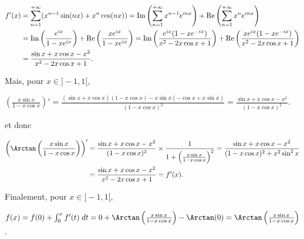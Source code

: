 {\begin{enumerate}
{\begin{align*}\ensuremath
f'(x)&=\sum_{n=1}^{+\infty}(x^{n-1}\sin(nx)+x^n\cos(nx))=\text{Im}\left(\sum_{n=1}^{+\infty}x^{n-1}e^{inx}\right)+\text{Re}\left(\sum_{n=1}^{+\infty}x^{n}e^{inx}\right)\\
 &=\text{Im}\left(\frac{e^{ix}}{1-xe^{ix}}\right)+\text{Re}\left(\frac{xe^{ix}}{1-xe^{ix}}\right)=\text{Im}\left(\frac{e^{ix}(1-xe^{-ix})}{x^2-2x\cos x+1}\right) +\text{Re}\left(\frac{xe^{ix}(1-xe^{-ix})}{x^2-2x\cos x+1}\right)\\
  &=\frac{\sin x+x\cos x-x^2}{x^2-2x\cos x+1}  .
\end{align*}

Mais, pour $x\in]-1,1[$,

\begin{center}
$\left(\frac{x\sin x}{1-x\cos x}\right)'=\frac{(\sin x+x\cos x)(1-x\cos x)-x\sin x(-\cos x+x\sin x)}{(1-x\cos x)^2}=\frac{\sin x+x\cos x-x^2}{(1-x\cos x)^2}$.
\end{center}

et donc

\begin{align*}\ensuremath
\left(\Arctan\left(\frac{x\sin x}{1-x\cos x}\right)\right)'&=\frac{\sin x+x\cos x-x^2}{(1-x\cos x)^2}\times\frac{1}{1+\left(\frac{x\sin x}{1-x\cos x}\right)^2}=\frac{\sin x+x\cos x-x^2}{(1-x\cos x)^2+x^2\sin^2x}\\
 &=\frac{\sin x+x\cos x-x^2}{x^2-2x\cos x+1}= f'(x).
\end{align*}

Finalement, pour $x\in]-1,1[$,

\begin{center}
$f(x)=f(0)+\int_{0}^{x}f'(t)\;dt=0+\Arctan\left(\frac{x\sin x}{1-x\cos x}\right)-\Arctan(0)=\Arctan\left(\frac{x\sin x}{1-x\cos x}\right)$.
\end{center}

\begin{center}
\shadowbox{
$\forall x\in]-1,1[$, $\sum_{n=1}^{+\infty}\frac{x^n\sin(nx)}{n}=\Arctan\left(\frac{x\sin x}{1-x\cos x}\right)$.
}
\end{center}}
\end{enumerate}
}
